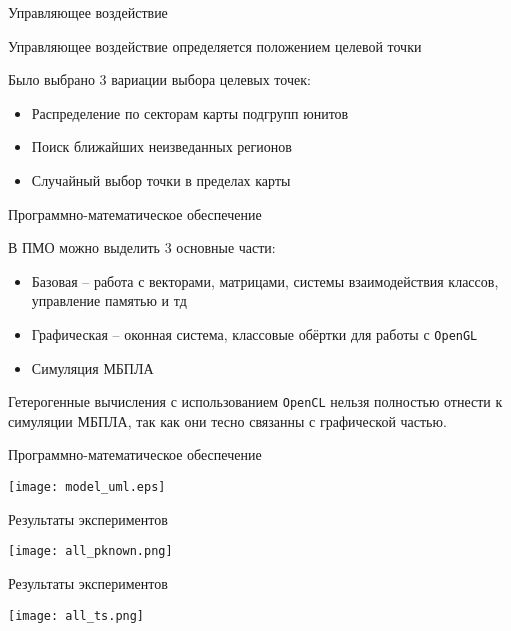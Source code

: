 \begin{tslide}{Управляющее воздействие}

    Управляющее воздействие определяется положением целевой
    точки

    Было выбрано 3 вариации выбора целевых точек:
    \begin{itemize}
        \item Распределение по секторам карты подгрупп юнитов
        \item Поиск ближайших неизведанных регионов
        \item Случайный выбор точки в пределах карты
    \end{itemize}

\end{tslide}

\begin{tslide}{Программно-математическое обеспечение}

    В ПМО можно выделить 3 основные части:
    \begin{itemize}
        \item Базовая -- работа с векторами, матрицами, системы
    взаимодействия классов, управление памятью и тд

        \item Графическая -- оконная система, классовые обёртки
            для работы с \verb|OpenGL|

        \item Симуляция МБПЛА
    \end{itemize}

    Гетерогенные вычисления с использованием \verb|OpenCL| нельзя
    полностью отнести к симуляции МБПЛА, так как они тесно связанны
    с графической частью.

\end{tslide}

\begin{tslide}{Программно-математическое обеспечение}

    \centering
    \texttt{[image: model\_uml.eps]}

\end{tslide}

\begin{tslide}{Результаты экспериментов}

    \centering
    \texttt{[image: all\_pknown.png]}
\end{tslide}

\begin{tslide}{Результаты экспериментов}

    \centering
    \texttt{[image: all\_ts.png]}
\end{tslide}


